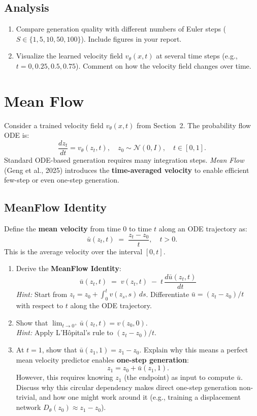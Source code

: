 \documentclass[11pt]{article}
\begin{document}
\subsection{Analysis}

\begin{enumerate}
    \item Compare generation quality with different numbers of Euler steps (\( S \in \{1, 5, 10, 50, 100\} \)). Include figures in your report.
    \item Visualize the learned velocity field \( v_\theta(x, t) \) at several time steps (e.g., \( t = 0, 0.25, 0.5, 0.75 \)). Comment on how the velocity field changes over time.
\end{enumerate}

\hrulefill

\section{Mean Flow}

Consider a trained velocity field \( v_\theta(x, t) \) from Section~2. The probability flow ODE is:
\[
\frac{dz_t}{dt} = v_\theta(z_t, t), \quad z_0 \sim \mathcal{N}(0, I), \quad t \in [0, 1].
\]
Standard ODE-based generation requires many integration steps. \emph{Mean Flow} (Geng et al., 2025) introduces the \textbf{time-averaged velocity} to enable efficient few-step or even one-step generation.

\subsection{MeanFlow Identity}

Define the \textbf{mean velocity} from time \( 0 \) to time \( t \) along an ODE trajectory as:
\[
\bar{u}(z_t, t) \;=\; \frac{z_t - z_0}{t}, \quad t > 0.
\]
This is the average velocity over the interval \( [0, t] \).

\begin{enumerate}[label=(\alph*)]
    \item Derive the \textbf{MeanFlow Identity}:
    \[
    \boxed{\;\bar{u}(z_t, t) \;=\; v(z_t, t) \;-\; t\,\frac{d\bar{u}(z_t, t)}{dt}\;}
    \]
    \emph{Hint:} Start from \( z_t = z_0 + \int_0^t v(z_s, s)\,ds \). Differentiate \( \bar{u} = (z_t - z_0)/t \) with respect to \( t \) along the ODE trajectory.

    \item Show that \( \displaystyle\lim_{t \to 0^+} \bar{u}(z_t, t) = v(z_0, 0) \). \\
    \emph{Hint:} Apply L'H\^{o}pital's rule to \( (z_t - z_0)/t \).

    \item At \( t = 1 \), show that \( \bar{u}(z_1, 1) = z_1 - z_0 \). Explain why this means a perfect mean velocity predictor enables \textbf{one-step generation}:
    \[
    z_1 = z_0 + \bar{u}(z_1, 1).
    \]
    However, this requires knowing \( z_1 \) (the endpoint) as input to compute \( \bar{u} \). Discuss why this circular dependency makes direct one-step generation non-trivial, and how one might work around it (e.g., training a displacement network \( D_\theta(z_0) \approx z_1 - z_0 \)).
\end{enumerate}
\end{document}
